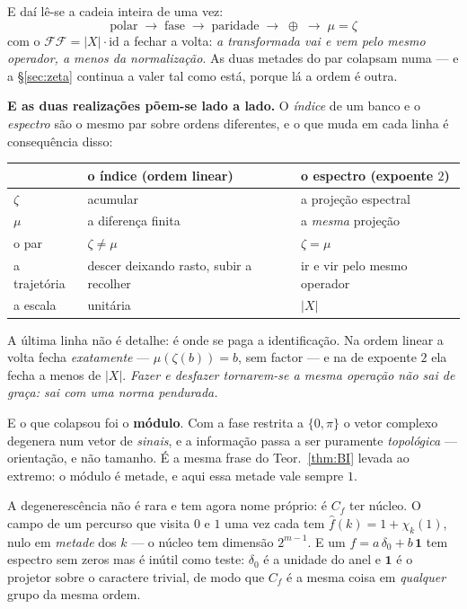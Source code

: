 \documentclass[11pt,a4paper]{article}
\begin{document}
\medskip\noindent E daí lê-se a cadeia inteira de uma vez:
\[
\text{polar}\;\longrightarrow\;\text{fase}\;\longrightarrow\;\text{paridade}
\;\longrightarrow\;\oplus\;\longrightarrow\;\mu=\zeta
\]
com o $\mathcal{F}\mathcal{F}=\lvert X\rvert\cdot\mathrm{id}$ a fechar a volta:
\emph{a transformada vai e vem pelo mesmo operador, a menos da normalização}.
As duas metades do par colapsam numa --- e a §\ref{sec:zeta} continua a valer
tal como está, porque lá a ordem é outra.

\medskip\noindent\textbf{E as duas realizações põem-se lado a lado.} O
\emph{índice} de um banco e o \emph{espectro} são o mesmo par sobre ordens
diferentes, e o que muda em cada linha é consequência disso:
\begin{center}\small
\begin{tabular}{@{}lll@{}}
\toprule
 & \textbf{o índice} (ordem linear) & \textbf{o espectro} (expoente $2$)\\
\midrule
$\zeta$ & acumular & a projeção espectral\\
$\mu$ & a diferença finita & a \emph{mesma} projeção\\
o par & $\zeta\neq\mu$ & $\boxed{\zeta=\mu}$\\
a trajetória & descer deixando rasto, subir a recolher & ir e vir pelo mesmo operador\\
a escala & unitária & $\lvert X\rvert$\\
\bottomrule
\end{tabular}
\end{center}

\noindent A última linha não é detalhe: é onde se paga a identificação. Na ordem
linear a volta fecha \emph{exatamente} --- $\mu(\zeta(b))=b$, sem factor --- e na
de expoente $2$ ela fecha a menos de $\lvert X\rvert$. \emph{Fazer e desfazer
tornarem-se a mesma operação não sai de graça: sai com uma norma pendurada.}

\medskip\noindent E o que colapsou foi o \textbf{módulo}. Com a fase restrita a
$\{0,\pi\}$ o vetor complexo degenera num vetor de \emph{sinais}, e a informação
passa a ser puramente \emph{topológica} --- orientação, e não tamanho. É a
mesma frase do Teor.~\ref{thm:BI} levada ao extremo: o módulo é metade, e aqui
essa metade vale sempre $1$.

\medskip\noindent A degenerescência não é rara e tem agora nome próprio: é $C_f$
ter núcleo. O campo de um percurso que visita $0$ e $1$ uma vez cada tem
$\widehat{f}(k)=1+\chi_k(1)$, nulo em \emph{metade} dos $k$ --- o núcleo tem
dimensão $2^{m-1}$. E um $f=a\,\delta_0+b\,\mathbf{1}$ tem espectro sem zeros mas é
inútil como teste: $\delta_0$ é a unidade do anel e $\mathbf{1}$ é o projetor
sobre o caractere trivial, de modo que $C_f$ é a mesma coisa em \emph{qualquer}
grupo da mesma ordem.
\end{document}
